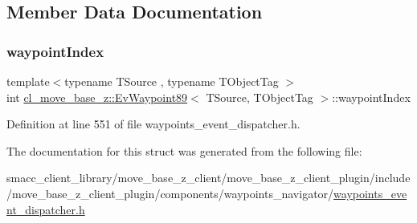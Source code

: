 \subsection{Member Data Documentation}
\mbox{\label{structcl__move__base__z_1_1EvWaypoint89_a324fcbc33ff4825f1bcc100fb2c4d0af}} 
\subsubsection{\texorpdfstring{waypoint\+Index}{waypointIndex}}
{\footnotesize\ttfamily template$<$typename T\+Source , typename T\+Object\+Tag $>$ \\
int \hyperlink{structcl__move__base__z_1_1EvWaypoint89}{cl\+\_\+move\+\_\+base\+\_\+z\+::\+Ev\+Waypoint89}$<$ T\+Source, T\+Object\+Tag $>$\+::waypoint\+Index}



Definition at line 551 of file waypoints\+\_\+event\+\_\+dispatcher.\+h.



The documentation for this struct was generated from the following file\+:\begin{DoxyCompactItemize}
\item 
smacc\+\_\+client\+\_\+library/move\+\_\+base\+\_\+z\+\_\+client/move\+\_\+base\+\_\+z\+\_\+client\+\_\+plugin/include/move\+\_\+base\+\_\+z\+\_\+client\+\_\+plugin/components/waypoints\+\_\+navigator/\hyperlink{waypoints__event__dispatcher_8h}{waypoints\+\_\+event\+\_\+dispatcher.\+h}\end{DoxyCompactItemize}
